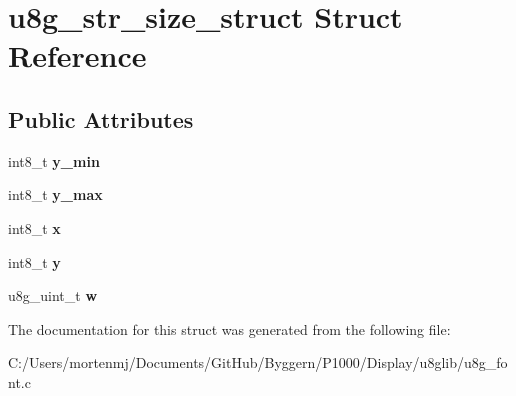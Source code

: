 \hypertarget{structu8g__str__size__struct}{\section{u8g\-\_\-str\-\_\-size\-\_\-struct Struct Reference}
\label{structu8g__str__size__struct}
}
\subsection*{Public Attributes}
\begin{DoxyCompactItemize}
\item 
\hypertarget{structu8g__str__size__struct_a57db134f25475b85a09f22f5e8e35341}{int8\-\_\-t {\bfseries y\-\_\-min}}\label{structu8g__str__size__struct_a57db134f25475b85a09f22f5e8e35341}

\item 
\hypertarget{structu8g__str__size__struct_ad8c6f2a2ecede855b5fb7b171c6bd117}{int8\-\_\-t {\bfseries y\-\_\-max}}\label{structu8g__str__size__struct_ad8c6f2a2ecede855b5fb7b171c6bd117}

\item 
\hypertarget{structu8g__str__size__struct_aebf73604e9daf35db15345ab86eaff9c}{int8\-\_\-t {\bfseries x}}\label{structu8g__str__size__struct_aebf73604e9daf35db15345ab86eaff9c}

\item 
\hypertarget{structu8g__str__size__struct_a1744b44a68d245414ddfc50c3295c709}{int8\-\_\-t {\bfseries y}}\label{structu8g__str__size__struct_a1744b44a68d245414ddfc50c3295c709}

\item 
\hypertarget{structu8g__str__size__struct_aa65461582ae04de6217694c5134a8326}{u8g\-\_\-uint\-\_\-t {\bfseries w}}\label{structu8g__str__size__struct_aa65461582ae04de6217694c5134a8326}

\end{DoxyCompactItemize}


The documentation for this struct was generated from the following file\-:\begin{DoxyCompactItemize}
\item 
C\-:/\-Users/mortenmj/\-Documents/\-Git\-Hub/\-Byggern/\-P1000/\-Display/u8glib/u8g\-\_\-font.\-c\end{DoxyCompactItemize}
